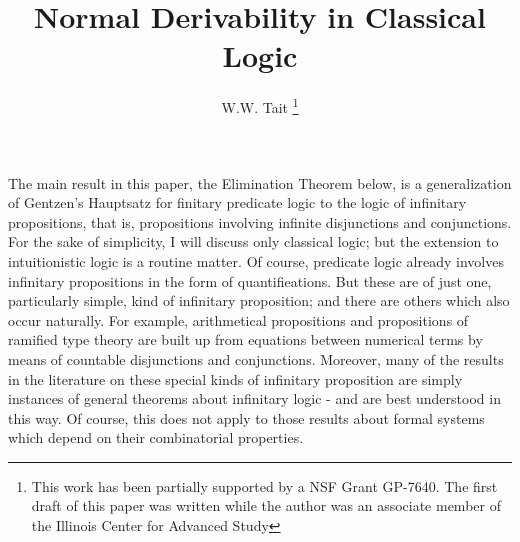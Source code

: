 \documentclass{article}
\begin{document}
\author{W.W. Tait \footnote{This work has been partially supported by a NSF Grant GP-7640. The first draft of this paper was written while the author was an associate member of the Illinois Center for Advanced Study}}
\title{Normal Derivability in Classical Logic}

\maketitle

The main result in this paper, the Elimination Theorem below, is a generalization of Gentzen's Hauptsatz \cite{gentzenTransfInd} for finitary predicate logic to the logic of infinitary propositions, that is, propositions involving infinite disjunctions and conjunctions. For the sake of simplicity, I will discuss only classical logic; but the extension to intuitionistic logic is a routine matter. Of course, predicate logic already involves infinitary propositions in the form of quantifieations. But these are of just one, particularly simple, kind of infinitary proposition; and there are others which also occur naturally. For example, arithmetical propositions and propositions of ramified type theory are built up from equations between numerical terms by means of countable disjunctions and conjunctions. Moreover, many of the results in the literature on these special kinds of infinitary proposition are simply instances of general theorems about infinitary logic - and are best understood in this way. Of course, this does not apply to those results about formal systems which depend on their combinatorial properties.
\end{document}
